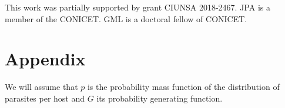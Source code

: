 \documentclass[bimj,fleqn]{w-art}
\theoremstyle{plain}
\theoremstyle{definition}
\begin{document}
\begin{acknowledgement}
This work was partially supported by grant CIUNSA 2018-2467. JPA is a member of the CONICET. GML is a doctoral fellow of CONICET.
\end{acknowledgement}
\vspace*{1pc}



\section*{Appendix}
We will assume that $p$ is the probability mass function of the distribution of parasites per host and $G$ its probability generating function.
\end{document}
